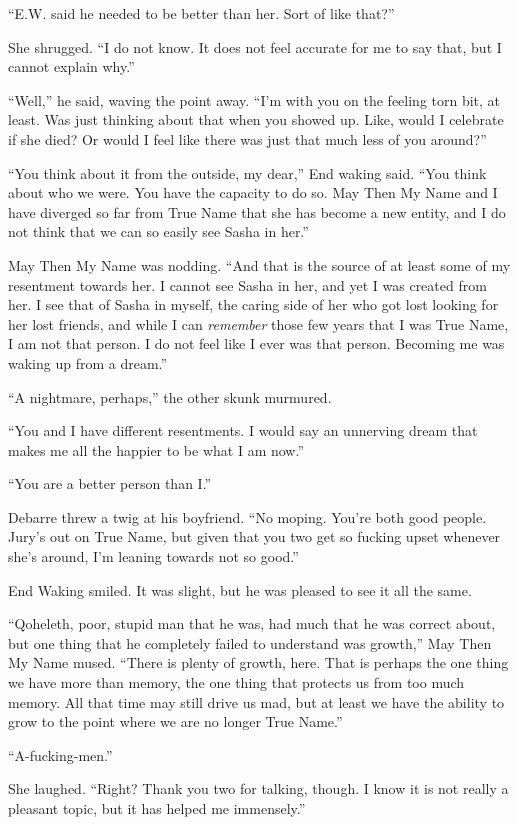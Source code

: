 ``E.W. said he needed to be better than her. Sort of like that?''

She shrugged. ``I do not know. It does not feel accurate for me to say that, but I cannot explain why.''

``Well,'' he said, waving the point away. ``I'm with you on the feeling torn bit, at least. Was just thinking about that when you showed up. Like, would I celebrate if she died? Or would I feel like there was just that much less of you around?''

``You think about it from the outside, my dear,'' End waking said. ``You think about who we were. You have the capacity to do so. May Then My Name and I have diverged so far from True Name that she has become a new entity, and I do not think that we can so easily see Sasha in her.''

May Then My Name was nodding. ``And that is the source of at least some of my resentment towards her. I cannot see Sasha in her, and yet I was created from her. I see that of Sasha in myself, the caring side of her who got lost looking for her lost friends, and while I can \emph{remember} those few years that I was True Name, I am not that person. I do not feel like I ever was that person. Becoming me was waking up from a dream.''

``A nightmare, perhaps,'' the other skunk murmured.

``You and I have different resentments. I would say an unnerving dream that makes me all the happier to be what I am now.''

``You are a better person than I.''

Debarre threw a twig at his boyfriend. ``No moping. You're both good people. Jury's out on True Name, but given that you two get so fucking upset whenever she's around, I'm leaning towards not so good.''

End Waking smiled. It was slight, but he was pleased to see it all the same.

``Qoheleth, poor, stupid man that he was, had much that he was correct about, but one thing that he completely failed to understand was growth,'' May Then My Name mused. ``There is plenty of growth, here. That is perhaps the one thing we have more than memory, the one thing that protects us from too much memory. All that time may still drive us mad, but at least we have the ability to grow to the point where we are no longer True Name.''

``A-fucking-men.''

She laughed. ``Right? Thank you two for talking, though. I know it is not really a pleasant topic, but it has helped me immensely.''

